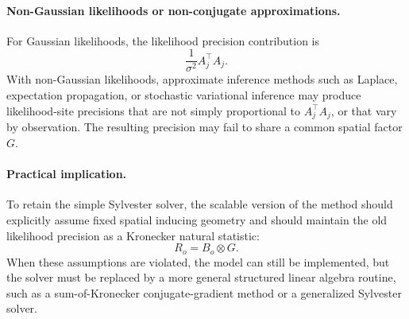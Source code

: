 \documentclass[12pt]{article}
\begin{document}
\paragraph{Non-Gaussian likelihoods or non-conjugate approximations.}
For Gaussian likelihoods, the likelihood precision contribution is
\begin{equation}
    \frac{1}{\sigma^2}A_j^\top A_j.
\end{equation}
With non-Gaussian likelihoods, approximate inference methods such as
Laplace, expectation propagation, or stochastic variational inference may
produce likelihood-site precisions that are not simply proportional to
\(A_j^\top A_j\), or that vary by observation. The resulting precision
may fail to share a common spatial factor \(G\).

\paragraph{Practical implication.}
To retain the simple Sylvester solver, the scalable version of the method
should explicitly assume fixed spatial inducing geometry and should
maintain the old likelihood precision as a Kronecker natural statistic:
\begin{equation}
    R_o=B_o\otimes G.
\end{equation}
When these assumptions are violated, the model can still be implemented,
but the solver must be replaced by a more general structured linear
algebra routine, such as a sum-of-Kronecker conjugate-gradient method or a
generalized Sylvester solver.
\end{document}
